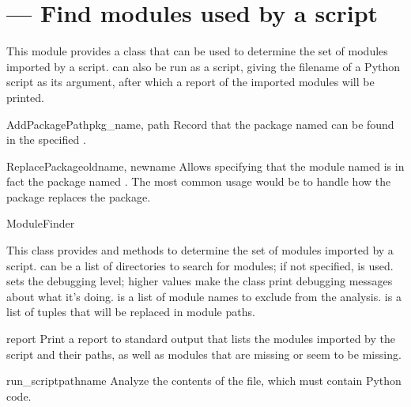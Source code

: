 \section{ ---
         Find modules used by a script}


This module provides a  class that can be used to
determine the set of modules imported by a script.
 can also be run as a script, giving the
filename of a Python script as its argument, after which a report of
the imported modules will be printed.

\begin{funcdesc}{AddPackagePath}{pkg_name, path}
Record that the package named  can be found in the specified .
\end{funcdesc}

\begin{funcdesc}{ReplacePackage}{oldname, newname}
Allows specifying that the module named  is in fact
the package named .  The most common usage would be 
to handle how the  package replaces the 
package.
\end{funcdesc}

\begin{classdesc}{ModuleFinder}{}

This class provides  and 
methods to determine the set of modules imported by a script.
 can be a list of directories to search for modules; if not
specified,  is used. 
 sets the debugging level; higher values make the class print 
debugging messages about what it's doing.
 is a list of module names to exclude from the analysis.
 is a list of 
tuples that will be replaced in module paths.
\end{classdesc}

\begin{methoddesc}[ModuleFinder]{report}{}
Print a report to standard output that lists the modules imported by the script
and their
paths, as well as modules that are missing or seem to be missing.
\end{methoddesc}

\begin{methoddesc}[ModuleFinder]{run_script}{pathname}
Analyze the contents of the  file, which must contain 
Python code.
\end{methoddesc}
 

